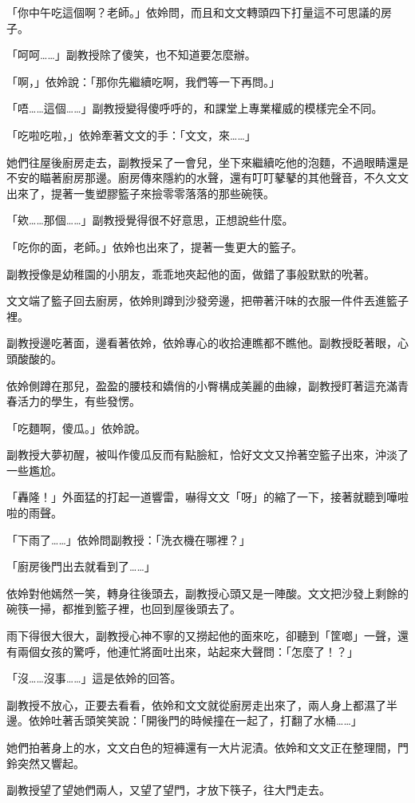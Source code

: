 「你中午吃這個啊？老師。」依姈問，而且和文文轉頭四下打量這不可思議的房子。

「呵呵……」副教授除了傻笑，也不知道要怎麼辦。

「啊，」依姈說：「那你先繼續吃啊，我們等一下再問。」

「唔……這個……」副教授變得傻呼呼的，和課堂上專業權威的模樣完全不同。

「吃啦吃啦，」依姈牽著文文的手：「文文，來……」

她們往屋後廚房走去，副教授呆了一會兒，坐下來繼續吃他的泡麵，不過眼睛還是不安的瞄著廚房那邊。廚房傳來隱約的水聲，還有叮叮鼕鼕的其他聲音，不久文文出來了，提著一隻塑膠籃子來撿零零落落的那些碗筷。

「欸……那個……」副教授覺得很不好意思，正想說些什麼。

「吃你的面，老師。」依姈也出來了，提著一隻更大的籃子。

副教授像是幼稚園的小朋友，乖乖地夾起他的面，做錯了事般默默的吮著。

文文端了籃子回去廚房，依姈則蹲到沙發旁邊，把帶著汗味的衣服一件件丟進籃子裡。

副教授邊吃著面，邊看著依姈，依姈專心的收拾連瞧都不瞧他。副教授眨著眼，心頭酸酸的。

依姈側蹲在那兒，盈盈的腰枝和嬌俏的小臀構成美麗的曲線，副教授盯著這充滿青春活力的學生，有些發愣。

「吃麵啊，傻瓜。」依姈說。

副教授大夢初醒，被叫作傻瓜反而有點臉紅，恰好文文又拎著空籃子出來，沖淡了一些尷尬。

「轟隆！」外面猛的打起一道響雷，嚇得文文「呀」的縮了一下，接著就聽到嘩啦啦的雨聲。

「下雨了……」依姈問副教授：「洗衣機在哪裡？」

「廚房後門出去就看到了……」

依姈對他嫣然一笑，轉身往後頭去，副教授心頭又是一陣酸。文文把沙發上剩餘的碗筷一掃，都推到籃子裡，也回到屋後頭去了。

雨下得很大很大，副教授心神不寧的又撈起他的面來吃，卻聽到「筐啷」一聲，還有兩個女孩的驚呼，他連忙將面吐出來，站起來大聲問：「怎麼了！？」

「沒……沒事……」這是依姈的回答。

副教授不放心，正要去看看，依姈和文文就從廚房走出來了，兩人身上都濕了半邊。依姈吐著舌頭笑笑說：「開後門的時候撞在一起了，打翻了水桶……」

她們拍著身上的水，文文白色的短褲還有一大片泥漬。依姈和文文正在整理間，門鈴突然又響起。

副教授望了望她們兩人，又望了望門，才放下筷子，往大門走去。

